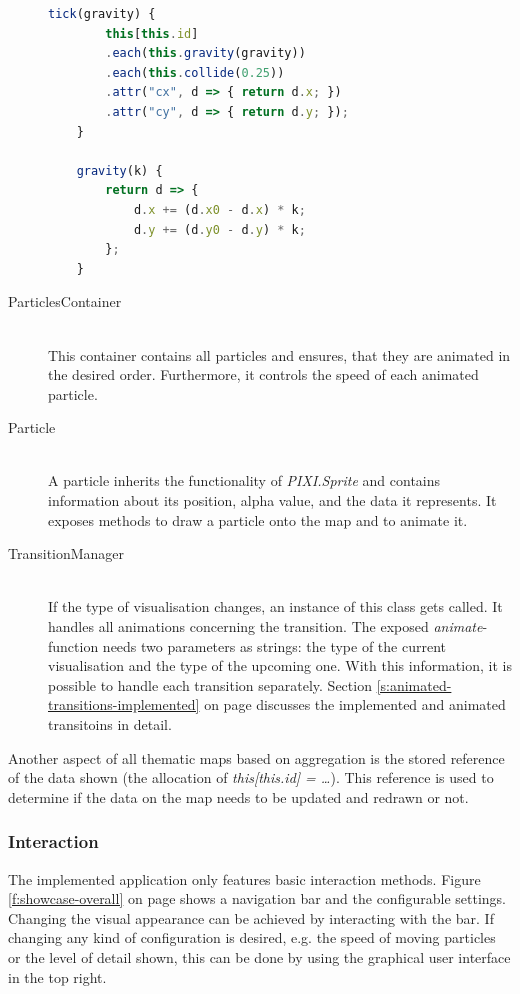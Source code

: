 \begin{description}
\begin{lstlisting}[language=JavaScript, caption={A small part of the draw-function of the pseudo Demers Cartogramm-class}, label={lst:cartogram-part-tick}]
    tick(gravity) {
        this[this.id]
        .each(this.gravity(gravity))
        .each(this.collide(0.25))
        .attr("cx", d => { return d.x; })
        .attr("cy", d => { return d.y; });
    }

    gravity(k) {
        return d => {
            d.x += (d.x0 - d.x) * k;
            d.y += (d.y0 - d.y) * k;
        };
    }
\end{lstlisting}

\item[ParticlesContainer] \hfill \\
This container contains all particles and ensures, that they are animated in the desired order. Furthermore, it controls the speed of each animated particle.

\item[Particle] \hfill \\
A particle inherits the functionality of \textit{PIXI.Sprite} and contains information about its position, alpha value, and the data it represents. It exposes methods to draw a particle onto the map and to animate it.

\item[TransitionManager] \hfill \\
If the type of visualisation changes, an instance of this class gets called. It handles all animations concerning the transition. The exposed \textit{animate}-function needs two parameters as strings: the type of the current visualisation and the type of the upcoming one. With this information, it is possible to handle each transition separately. Section \ref{s:animated-transitions-implemented} on page \pageref{s:animated-transitions-implemented} discusses the implemented and animated transitoins in detail.
\end{description}

Another aspect of all thematic maps based on aggregation is the stored reference of the data shown (the allocation of \textit{this[this.id] = \ldots}). This reference is used to determine if the data on the map needs to be updated and redrawn or not.

\subsubsection{Interaction}
The implemented application only features basic interaction methods. Figure \ref{f:showcase-overall} on page \pageref{f:showcase-overall} shows a navigation bar and the configurable settings. Changing the visual appearance can be achieved by interacting with the bar. If changing any kind of configuration is desired, e.g. the speed of moving particles or the level of detail shown, this can be done by using the graphical user interface in the top right.

